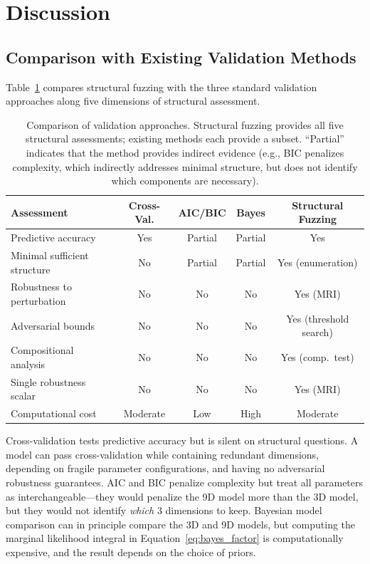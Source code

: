 \documentclass[12pt]{article}
\begin{document}
\section{Discussion}
\label{sec:discussion}

\subsection{Comparison with Existing Validation Methods}

Table~\ref{tab:comparison} compares structural fuzzing with the three standard validation approaches along five dimensions of structural assessment.

\begin{table}[H]
\centering
\caption{Comparison of validation approaches.  Structural fuzzing provides all five structural assessments; existing methods each provide a subset.  ``Partial'' indicates that the method provides indirect evidence (e.g., BIC penalizes complexity, which indirectly addresses minimal structure, but does not identify which components are necessary).}
\label{tab:comparison}
\small
\begin{tabular}{@{}lcccc@{}}
\toprule
\textbf{Assessment} & \textbf{Cross-Val.} & \textbf{AIC/BIC} & \textbf{Bayes} & \textbf{Structural Fuzzing} \\
\midrule
Predictive accuracy & Yes & Partial & Partial & Yes \\
Minimal sufficient structure & No & Partial & Partial & Yes (enumeration) \\
Robustness to perturbation & No & No & No & Yes (MRI) \\
Adversarial bounds & No & No & No & Yes (threshold search) \\
Compositional analysis & No & No & No & Yes (comp.\ test) \\
Single robustness scalar & No & No & No & Yes (MRI) \\
\midrule
Computational cost & Moderate & Low & High & Moderate \\
\bottomrule
\end{tabular}
\end{table}

Cross-validation tests predictive accuracy but is silent on structural questions.  A model can pass cross-validation while containing redundant dimensions, depending on fragile parameter configurations, and having no adversarial robustness guarantees.  AIC and BIC penalize complexity but treat all parameters as interchangeable---they would penalize the 9D model more than the 3D model, but they would not identify \emph{which} 3 dimensions to keep.  Bayesian model comparison can in principle compare the 3D and 9D models, but computing the marginal likelihood integral in Equation~\eqref{eq:bayes_factor} is computationally expensive, and the result depends on the choice of priors.
\end{document}
